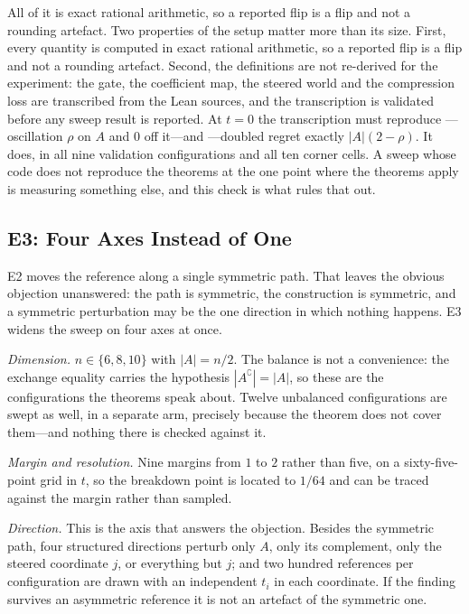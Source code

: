 \noindent All of it is exact rational arithmetic, so a reported flip is a flip and not a
rounding artefact. Two properties of the setup matter more than its size. First, every quantity is computed in
exact rational arithmetic, so a reported flip is a flip and not a rounding artefact. Second,
the definitions are not re-derived for the experiment: the gate, the coefficient map, the
steered world and the compression loss are transcribed from the Lean sources, and the
transcription is validated before any sweep result is reported. At $t=0$ the transcription
must reproduce ---oscillation $\rho$ on $A$ and $0$ off it---and
---doubled regret exactly $|A|(2-\rho)$. It does, in all
nine validation configurations and all ten corner cells. A sweep whose code does not
reproduce the theorems at the one point where the theorems apply is measuring something else,
and this check is what rules that out.

\subsection{E3: Four Axes Instead of One}
\label{sec:e3}

E2 moves the reference along a single symmetric path. That leaves the obvious objection
unanswered: the path is symmetric, the construction is symmetric, and a symmetric
perturbation may be the one direction in which nothing happens. E3 widens the sweep on four
axes at once.

\emph{Dimension.} $n\in\{6,8,10\}$ with $|A|=n/2$. The balance is not a convenience: the
exchange equality carries the hypothesis $|A^{\complement}|=|A|$, so these are the
configurations the theorems speak about. Twelve unbalanced configurations are swept as well,
in a separate arm, precisely because the theorem does not cover them---and nothing there is
checked against it.

\emph{Margin and resolution.} Nine margins from $1$ to $2$ rather than five, on a
sixty-five-point grid in $t$, so the breakdown point is located to $1/64$ and can be traced
against the margin rather than sampled.

\emph{Direction.} This is the axis that answers the objection. Besides the symmetric path,
four structured directions perturb only $A$, only its complement, only the steered coordinate
$j$, or everything but $j$; and two hundred references per configuration are drawn with an
independent $t_{i}$ in each coordinate. If the finding survives an asymmetric reference it is
not an artefact of the symmetric one.

